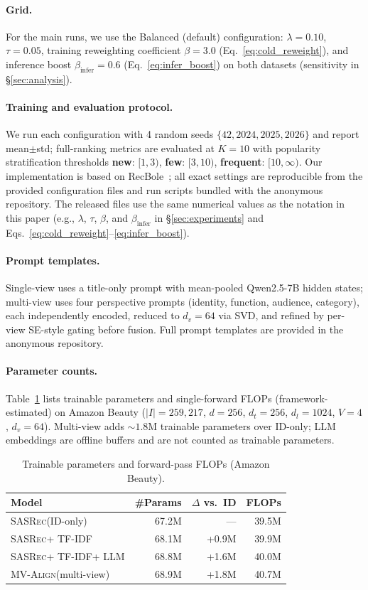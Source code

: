 \documentclass[sigconf,natbib=true,anonymous]{acmart}
\newcommand{\model}{\textsc{MV-Align}\xspace}
\newcommand{\base}{\textsc{SASRec}\xspace}
\newcommand{\tfidf}{\textsc{TF-IDF}\xspace}
\newcommand{\llm}{\textsc{LLM}\xspace}
\begin{document}
\paragraph{Grid.}
For the main runs, we use the Balanced (default) configuration:
$\lambda=0.10$, $\tau=0.05$, training reweighting coefficient
$\beta=3.0$ (Eq.~\eqref{eq:cold_reweight}), and inference boost
$\beta_{\text{infer}}=0.6$ (Eq.~\eqref{eq:infer_boost}) on both datasets
(sensitivity in \S\ref{sec:analysis}).
\paragraph{Training and evaluation protocol.}
We run each configuration with 4 random seeds
$\{42, 2024, 2025, 2026\}$ and report mean$\pm$std;
full-ranking metrics are evaluated at $K{=}10$
with popularity stratification thresholds
\textbf{new}: $[1,3)$, \textbf{few}: $[3,10)$,
\textbf{frequent}: $[10,\infty)$. Our implementation is based on
RecBole~\cite{zhao2021recbole}; all exact settings are
reproducible from the provided configuration files and run scripts
bundled with the anonymous repository.
The released files use the same numerical values as the notation in this paper
(e.g., $\lambda$, $\tau$, $\beta$, and $\beta_{\text{infer}}$ in
\S\ref{sec:experiments} and Eqs.~\eqref{eq:cold_reweight}--\eqref{eq:infer_boost}).
\paragraph{Prompt templates.}
Single-view uses a title-only prompt with mean-pooled Qwen2.5-7B hidden states;
multi-view uses four perspective prompts (identity, function, audience, category),
each independently encoded, reduced to $d_v{=}64$ via SVD, and refined by per-view
SE-style gating before fusion. Full prompt templates are provided in the anonymous repository.

\paragraph{Parameter counts.}
Table~\ref{tab:params} lists trainable parameters and single-forward
FLOPs (framework-estimated) on Amazon Beauty ($|I|{=}259{,}217$,
$d{=}256$, $d_t{=}256$, $d_l{=}1024$, $V{=}4$, $d_v{=}64$).
Multi-view adds ${\sim}1.8$M trainable parameters over ID-only; \llm
embeddings are offline buffers and are not counted as trainable
parameters.

\begin{table}[h]
\caption{Trainable parameters and forward-pass FLOPs (Amazon Beauty).}
\label{tab:params}
\centering
\small
\begin{tabular}{lrrr}
\toprule
\textbf{Model} & \textbf{\#Params} & \textbf{$\Delta$ vs.\ ID} & \textbf{FLOPs} \\
\midrule
\base (ID-only) & 67.2M & --- & 39.5M \\
\base + \tfidf & 68.1M & +0.9M & 39.9M \\
\base + \tfidf + \llm & 68.8M & +1.6M & 40.0M \\
\model (multi-view) & 68.9M & +1.8M & 40.7M \\
\bottomrule
\end{tabular}
\end{table}
\end{document}
